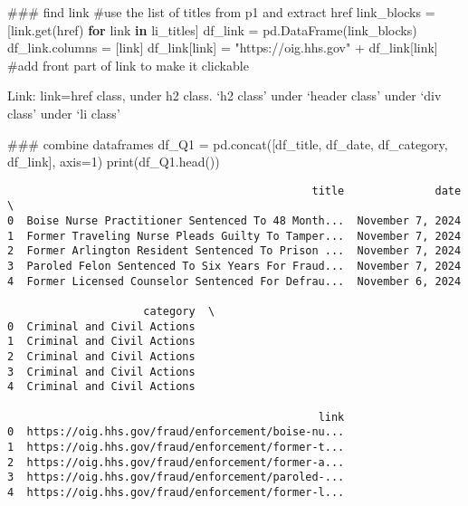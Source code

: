 \documentclass[
  letterpaper,
  DIV=11,
  numbers=noendperiod]{scrartcl}
\newenvironment{Shaded}{\begin{snugshade}}{\end{snugshade}}
\newcommand{\BuiltInTok}[1]{\textcolor[rgb]{0.00,0.23,0.31}{#1}}
\newcommand{\CommentTok}[1]{\textcolor[rgb]{0.37,0.37,0.37}{#1}}
\newcommand{\ControlFlowTok}[1]{\textcolor[rgb]{0.00,0.23,0.31}{\textbf{#1}}}
\newcommand{\DecValTok}[1]{\textcolor[rgb]{0.68,0.00,0.00}{#1}}
\newcommand{\KeywordTok}[1]{\textcolor[rgb]{0.00,0.23,0.31}{\textbf{#1}}}
\newcommand{\NormalTok}[1]{\textcolor[rgb]{0.00,0.23,0.31}{#1}}
\newcommand{\OperatorTok}[1]{\textcolor[rgb]{0.37,0.37,0.37}{#1}}
\newcommand{\StringTok}[1]{\textcolor[rgb]{0.13,0.47,0.30}{#1}}
\begin{document}
\begin{Shaded}
\begin{Highlighting}[]
\CommentTok{\#\#\# find link}
\CommentTok{\#use the list of titles from p1 and extract href}
\NormalTok{link\_blocks }\OperatorTok{=}\NormalTok{ [link.get(}\StringTok{\textquotesingle{}href\textquotesingle{}}\NormalTok{) }\ControlFlowTok{for}\NormalTok{ link }\KeywordTok{in}\NormalTok{ li\_titles]}
\NormalTok{df\_link }\OperatorTok{=}\NormalTok{ pd.DataFrame(link\_blocks)}
\NormalTok{df\_link.columns }\OperatorTok{=}\NormalTok{ [}\StringTok{\textquotesingle{}link\textquotesingle{}}\NormalTok{]}
\NormalTok{df\_link[}\StringTok{\textquotesingle{}link\textquotesingle{}}\NormalTok{] }\OperatorTok{=} \StringTok{"https://oig.hhs.gov"} \OperatorTok{+}\NormalTok{ df\_link[}\StringTok{\textquotesingle{}link\textquotesingle{}}\NormalTok{] }\CommentTok{\#add front part of link to make it clickable}
\end{Highlighting}
\end{Shaded}

Link: link=href class, under h2 class. `h2 class' under `header class'
under `div class' under `li class'

\begin{Shaded}
\begin{Highlighting}[]
\CommentTok{\#\#\# combine dataframes}
\NormalTok{df\_Q1 }\OperatorTok{=}\NormalTok{ pd.concat([df\_title, df\_date, df\_category, df\_link], axis}\OperatorTok{=}\DecValTok{1}\NormalTok{)}
\BuiltInTok{print}\NormalTok{(df\_Q1.head())}
\end{Highlighting}
\end{Shaded}

\begin{verbatim}
                                               title              date  \
0  Boise Nurse Practitioner Sentenced To 48 Month...  November 7, 2024   
1  Former Traveling Nurse Pleads Guilty To Tamper...  November 7, 2024   
2  Former Arlington Resident Sentenced To Prison ...  November 7, 2024   
3  Paroled Felon Sentenced To Six Years For Fraud...  November 7, 2024   
4  Former Licensed Counselor Sentenced For Defrau...  November 6, 2024   

                     category  \
0  Criminal and Civil Actions   
1  Criminal and Civil Actions   
2  Criminal and Civil Actions   
3  Criminal and Civil Actions   
4  Criminal and Civil Actions   

                                                link  
0  https://oig.hhs.gov/fraud/enforcement/boise-nu...  
1  https://oig.hhs.gov/fraud/enforcement/former-t...  
2  https://oig.hhs.gov/fraud/enforcement/former-a...  
3  https://oig.hhs.gov/fraud/enforcement/paroled-...  
4  https://oig.hhs.gov/fraud/enforcement/former-l...  
\end{verbatim}
\end{document}
